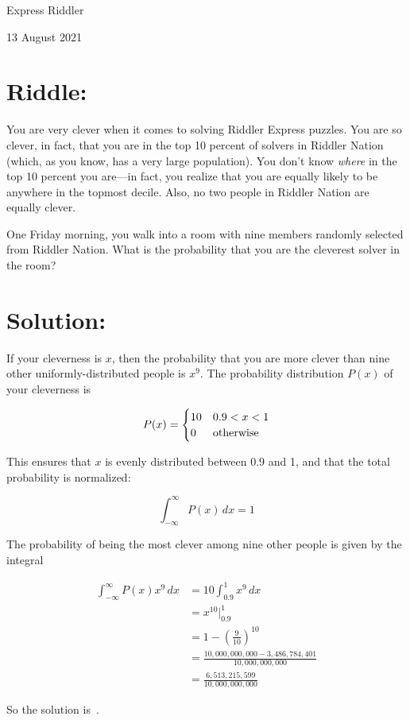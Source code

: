 \documentclass{article}
\begin{document}
\pagestyle{empty} %

\begin{center}
{\LARGE Express Riddler}

\vspace{0.15in}

{\Large 13 August 2021}
\end{center}


\section*{Riddle:}

You are very clever when it comes to solving Riddler Express puzzles.
You are so clever, in fact, that you are in the top 10 percent of solvers in Riddler Nation (which, as you know, has a very large population).
You don’t know \textit{where} in the top 10 percent you are---in fact, you realize that you are equally likely to be anywhere in the topmost decile.
Also, no two people in Riddler Nation are equally clever.

One Friday morning, you walk into a room with nine members randomly selected from Riddler Nation.
What is the probability that you are the cleverest solver in the room?


\section*{Solution:}

If your cleverness is $x$, then the probability that you are more clever than nine other uniformly-distributed people is $x^{9}$.
The probability distribution $P(x)$ of your cleverness is

\[
P(x)=
\begin{cases}
10 & 0.9<x<1 \\
0  & \rm{otherwise}
\end{cases}
\]

This ensures that $x$ is evenly distributed between 0.9 and 1, and that the total probability is normalized:

\[
\int_{-\infty}^{\infty}P(x)\,dx=1
\]

The probability of being the most clever among nine other people is given by the integral

\begin{align*}
\int_{-\infty}^{\infty}P(x)x^{9}\,dx &= 10\int_{0.9}^{1}x^{9}\, dx \\
&= x^{10}\big|_{0.9}^{1} \\
&= 1-\left(\frac{9}{10}\right)^{10} \\
&= \frac{10{,}000{,}000{,}000-3{,}486{,}784{,}401}{10{,}000{,}000{,}000} \\
&= \frac{6{,}513{,}215{,}599}{10{,}000{,}000{,}000}
\end{align*}

So the solution is
\,.
\end{document}
